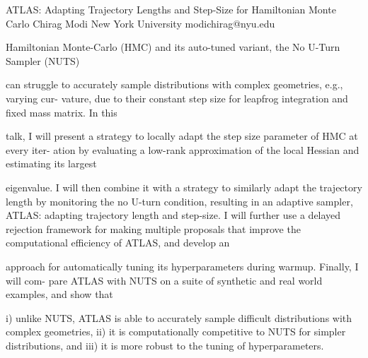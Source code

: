 \begin{talk}
  {ATLAS: Adapting Trajectory Lengths and Step-Size for Hamiltonian Monte Carlo}%
  {Chirag Modi}%
  {New York University}%
  {modichirag@nyu.edu}%
  {}%
  
    

Hamiltonian Monte-Carlo (HMC) and its auto-tuned variant, the No U-Turn Sampler (NUTS)

can struggle to accurately sample distributions with complex geometries, e.g., varying cur-
vature, due to their constant step size for leapfrog integration and fixed mass matrix. In this

talk, I will present a strategy to locally adapt the step size parameter of HMC at every iter-
ation by evaluating a low-rank approximation of the local Hessian and estimating its largest

eigenvalue. I will then combine it with a strategy to similarly adapt the trajectory length
by monitoring the no U-turn condition, resulting in an adaptive sampler, ATLAS: adapting
trajectory length and step-size. I will further use a delayed rejection framework for making
multiple proposals that improve the computational efficiency of ATLAS, and develop an

approach for automatically tuning its hyperparameters during warmup. Finally, I will com-
pare ATLAS with NUTS on a suite of synthetic and real world examples, and show that

i) unlike NUTS, ATLAS is able to accurately sample difficult distributions with complex
geometries, ii) it is computationally competitive to NUTS for simpler distributions, and iii)
it is more robust to the tuning of hyperparameters.
\medskip

\end{talk}

